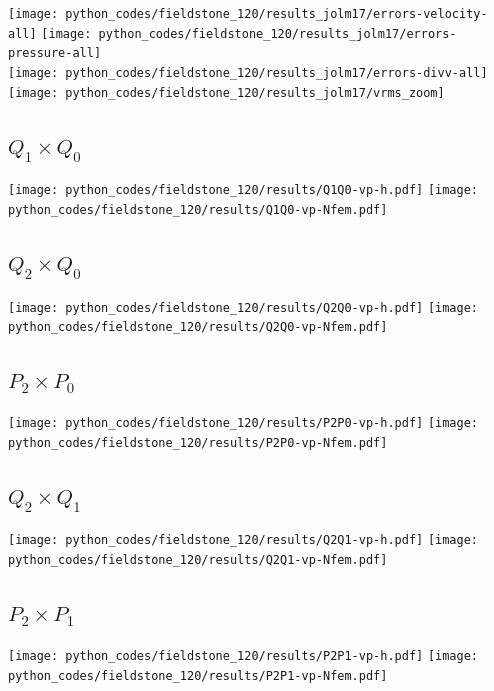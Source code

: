 \begin{center}
\texttt{[image: python\_codes/fieldstone\_120/results\_jolm17/errors-velocity-all]}
\texttt{[image: python\_codes/fieldstone\_120/results\_jolm17/errors-pressure-all]}\\
\texttt{[image: python\_codes/fieldstone\_120/results\_jolm17/errors-divv-all]}
\texttt{[image: python\_codes/fieldstone\_120/results\_jolm17/vrms\_zoom]}
\end{center}

\subsection*{$Q_1\times Q_0$}
\begin{center}
\texttt{[image: python\_codes/fieldstone\_120/results/Q1Q0-vp-h.pdf]}
\texttt{[image: python\_codes/fieldstone\_120/results/Q1Q0-vp-Nfem.pdf]}
\end{center}

\subsection*{$Q_2\times Q_0$}
\begin{center}
\texttt{[image: python\_codes/fieldstone\_120/results/Q2Q0-vp-h.pdf]}
\texttt{[image: python\_codes/fieldstone\_120/results/Q2Q0-vp-Nfem.pdf]}
\end{center}

\subsection*{$P_2\times P_0$}
\begin{center}
\texttt{[image: python\_codes/fieldstone\_120/results/P2P0-vp-h.pdf]}
\texttt{[image: python\_codes/fieldstone\_120/results/P2P0-vp-Nfem.pdf]}
\end{center}

\subsection*{$Q_2\times Q_1$}
\begin{center}
\texttt{[image: python\_codes/fieldstone\_120/results/Q2Q1-vp-h.pdf]}
\texttt{[image: python\_codes/fieldstone\_120/results/Q2Q1-vp-Nfem.pdf]}
\end{center}

\subsection*{$P_2\times P_1$}
\begin{center}
\texttt{[image: python\_codes/fieldstone\_120/results/P2P1-vp-h.pdf]}
\texttt{[image: python\_codes/fieldstone\_120/results/P2P1-vp-Nfem.pdf]}
\end{center}

